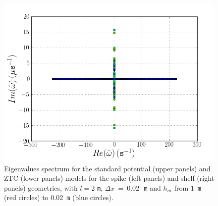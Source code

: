 \begin{figure}
\begin{center}
\includegraphics[type=png,ext=.png,read=.png,width=\smallfig]{chapters/lopes/png/L_2_dx_0.02_hm_shelf_spectrum_Zhao}
\end{center}
 \caption{Eigenvalues spectrum for the standard potential
 (upper panels) and ZTC (lower panels)
 models for the spike (left panels) and
 shelf (right panels) geometries, with  $l=2$ {\tt m},
 $\Delta x~=~0.02$\,~{\tt m} and $h_m$ from $1$~{\tt m} (red circles)
 to $0.02$~{\tt m} (blue circles).}
 \label{fig:lopes:spectrumhm1}
 \end{figure}

